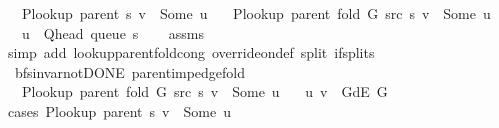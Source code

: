 \begin{isabellebody}
\ \ \ {\isachardoublequoteopen}P{\isacharunderscore}{\kern0pt}lookup\ {\isacharparenleft}{\kern0pt}parent\ s{\isacharparenright}{\kern0pt}\ v\ {\isasymnoteq}\ Some\ u{\isachardoublequoteclose}\isanewline
\ \ \ {\isachardoublequoteopen}P{\isacharunderscore}{\kern0pt}lookup\ {\isacharparenleft}{\kern0pt}parent\ {\isacharparenleft}{\kern0pt}fold\ G\ src\ s{\isacharparenright}{\kern0pt}{\isacharparenright}{\kern0pt}\ v\ {\isacharequal}{\kern0pt}\ Some\ u{\isachardoublequoteclose}\isanewline
\ \ \ {\isachardoublequoteopen}u\ {\isacharequal}{\kern0pt}\ Q{\isacharunderscore}{\kern0pt}head\ {\isacharparenleft}{\kern0pt}queue\ s{\isacharparenright}{\kern0pt}{\isachardoublequoteclose}\isanewline
%
\isadelimproof
\ \ %
\endisadelimproof
%
\isatagproof
{}\isamarkupfalse%
\ assms\isanewline
\ \ \isamarkupfalse%
\ {\isacharparenleft}{\kern0pt}simp\ add{\isacharcolon}{\kern0pt}\ lookup{\isacharunderscore}{\kern0pt}parent{\isacharunderscore}{\kern0pt}fold{\isacharunderscore}{\kern0pt}cong\ override{\isacharunderscore}{\kern0pt}on{\isacharunderscore}{\kern0pt}def\ split{\isacharcolon}{\kern0pt}\ if{\isacharunderscore}{\kern0pt}splits{\isacharparenleft}{\kern0pt}{}{\isacharparenright}{\kern0pt}{\isacharparenright}{\kern0pt}%
\endisatagproof
{\isafoldproof}%
%
\isadelimproof
\isanewline
%
\endisadelimproof
\isanewline
{}\isamarkupfalse%
\ {\isacharparenleft}{\kern0pt}\ bfs{\isacharunderscore}{\kern0pt}invar{\isacharunderscore}{\kern0pt}not{\isacharunderscore}{\kern0pt}DONE{\isacharparenright}{\kern0pt}\ parent{\isacharunderscore}{\kern0pt}imp{\isacharunderscore}{\kern0pt}edge{\isacharunderscore}{\kern0pt}fold{\isacharcolon}{\kern0pt}\isanewline
\ \ \ {\isachardoublequoteopen}P{\isacharunderscore}{\kern0pt}lookup\ {\isacharparenleft}{\kern0pt}parent\ {\isacharparenleft}{\kern0pt}fold\ G\ src\ s{\isacharparenright}{\kern0pt}{\isacharparenright}{\kern0pt}\ v\ {\isacharequal}{\kern0pt}\ Some\ u{\isachardoublequoteclose}\isanewline
\ \ \ {\isachardoublequoteopen}{\isacharparenleft}{\kern0pt}u{\isacharcomma}{\kern0pt}\ v{\isacharparenright}{\kern0pt}\ {\isasymin}\ G{\isachardot}{\kern0pt}dE\ G{\isachardoublequoteclose}\isanewline
%
\isadelimproof
%
\endisadelimproof
%
\isatagproof
{}\isamarkupfalse%
\ {\isacharparenleft}{\kern0pt}cases\ {\isachardoublequoteopen}P{\isacharunderscore}{\kern0pt}lookup\ {\isacharparenleft}{\kern0pt}parent\ s{\isacharparenright}{\kern0pt}\ v\ {\isacharequal}{\kern0pt}\ Some\ u{\isachardoublequoteclose}{\isacharparenright}{\kern0pt}\isanewline

\end{isabellebody}
